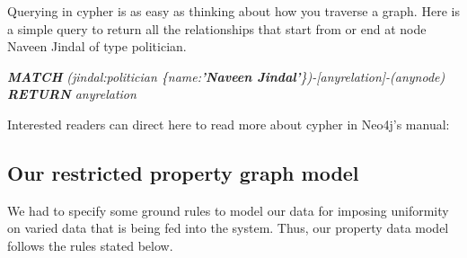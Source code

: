 Querying in cypher is as easy as thinking about how you traverse a graph. Here is a simple query to return all the relationships that start from or end at node Naveen Jindal of type politician.

\emph{ \textbf{MATCH} (jindal:politician \{name:\textbf{'Naveen Jindal'}\})-[anyrelation]-(anynode)
 \textbf{RETURN} anyrelation }

Interested readers can direct here to read more about cypher in Neo4j's manual\cite{neomanual}: 
\subsection{Our restricted property graph model}

We had to specify some ground rules to model our data for imposing uniformity on varied data that is being fed into the system. Thus, our property data model follows the rules stated below.

